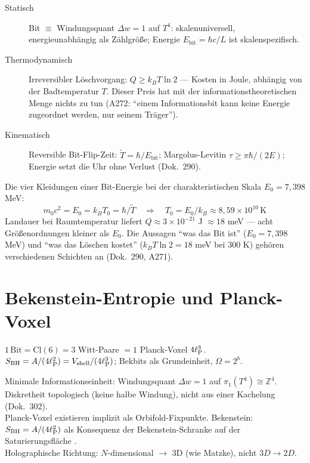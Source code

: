 \begin{description}
  \item[Statisch] Bit $\equiv$ Windungsquant $\Delta w = 1$ auf $T^4$:
    skalenuniversell, energieunabhängig als Zählgröße;
    Energie $E_{\mathrm{bit}} = \hbar c/L$ ist skalenspezifisch.
  \item[Thermodynamisch] Irreversibler Löschvorgang:
    $Q \geq k_B T\ln 2$ — Kosten in Joule, abhängig von der Badtemperatur $T$.
    Dieser Preis hat mit der informationstheoretischen Menge nichts zu tun
    (A272: \enquote{einem Informationsbit kann keine Energie zugeordnet werden,
    nur seinem Träger}).
  \item[Kinematisch] Reversible Bit-Flip-Zeit:
    $\tilde{T} = \hbar/E_{\mathrm{bit}}$;
    Margolus-Levitin $\tau \geq \pi\hbar/(2E)$;
    Energie setzt die Uhr ohne Verlust (Dok.\ 290).
\end{description}

Die vier Kleidungen einer Bit-Energie bei der charakteristischen Skala $E_0 = 7{,}398$ MeV:
\begin{equation}
  m_0 c^2 = E_0 = k_B T_0 = \hbar/\tilde{T}
  \quad\Rightarrow\quad
  T_0 = E_0/k_B \approx 8{,}59\times10^{10}\,\mathrm{K}
\end{equation}
Landauer bei Raumtemperatur liefert $Q \approx 3\times10^{-21}$ J $\approx 18$ meV —
acht Größenordnungen kleiner als $E_0$.
Die Aussagen \enquote{was das Bit ist} ($E_0 = 7{,}398$ MeV)
und \enquote{was das Löschen kostet} ($k_BT\ln 2 = 18$ meV bei 300 K)
gehören verschiedenen Schichten an (Dok.\ 290, A271).

\section{Bekenstein-Entropie und Planck-Voxel}

\begin{tcolorbox}[matzbox, title={Matzke}]
  $1\,\mathrm{Bit} = \mathrm{Cl}(6) = 3$ Witt-Paare $= 1$ Planck-Voxel $4\ell_{\mathrm{P}}^3$. \B\\
  $S_{\mathrm{BH}} = A/(4\ell_{\mathrm{P}}^2) = V_{\mathrm{shell}}/(4\ell_{\mathrm{P}}^3)$;
  Bekbits als Grundeinheit, $\Omega = 2^b$.
\end{tcolorbox}

\begin{tcolorbox}[ffgftbox, title={FFGFT}]
  Minimale Informationseinheit: Windungsquant $\Delta w = 1$ auf $\pi_1(T^4) \cong \mathbb{Z}^4$.
  Diskretheit topologisch (keine halbe Windung), nicht aus einer Kachelung (Dok.\ 302).\\
  Planck-Voxel existieren implizit als Orbifold-Fixpunkte.
  Bekenstein: $S_{\mathrm{BH}} = A/(4\ell_{\mathrm{P}}^2)$ als Konsequenz der Bekenstein-Schranke auf der
  Saturierungsfläche \B.\\
  Holographische Richtung: $N$-dimensional $\to$ 3D (wie Matzke), nicht $3D \to 2D$.
\end{tcolorbox}

